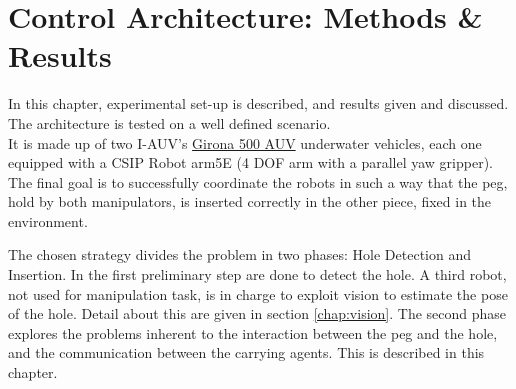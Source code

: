 

\chapter{Control Architecture: Methods \& Results}
\label{chap:method}
\ifpdf
    \graphicspath{{Method/Figures/PNG/}{Method/Figures/PDF/}{Method/Figures/}}
\else
    \graphicspath{{Method/Figures/EPS/}{Method/Figures/}}
\fi

In this chapter, experimental set-up is described, and results given and discussed. The architecture is tested on a well defined scenario.\\
It is made up of two I-AUV's \href{https://cirs.udg.edu/auvs-technology/auvs/girona-500-auv/}{Girona 500 AUV} underwater vehicles, each one equipped with a CSIP Robot arm5E (4 DOF arm with a parallel yaw gripper). The final goal is to successfully coordinate the robots in such a way that the peg, hold by both manipulators, is inserted correctly in the other piece, fixed in the environment. 

The chosen strategy divides the problem in two phases: Hole Detection and Insertion. In the first preliminary step are done to detect the hole. A third robot, not used for manipulation task, is in charge to exploit vision to estimate the pose of the hole. Detail about this are given in section \ref{chap:vision}.
The second phase explores the problems inherent to the interaction between the peg and the hole, and the communication between the carrying agents. This is described in this chapter.
                          


